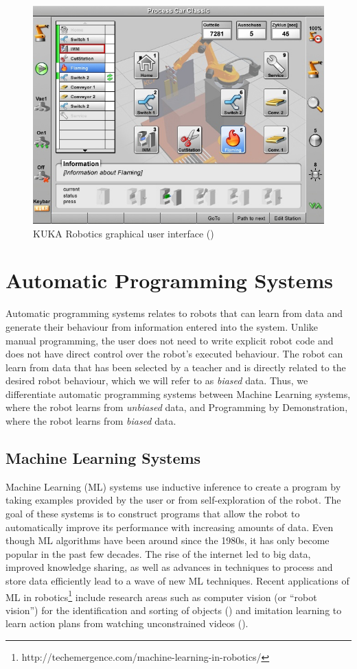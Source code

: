 \begin{figure}[h]
	\centering
	\includegraphics[width=0.8\linewidth]{figures/kuka.jpg}
	\caption{KUKA Robotics graphical user interface (\cite{kuka2006})}
	\label{fig:Kuka}
\end{figure} 

\section{Automatic Programming Systems}\label{subsec:Automatic Programming Systems}
Automatic programming systems relates to robots that can learn from data and generate their behaviour from information entered into the system.
Unlike manual programming, the user does not need to write explicit robot code and does not have direct control over the robot's executed behaviour.
The robot can learn from data that has been selected by a teacher and is directly related to the desired robot behaviour, which we will refer to as \textit{biased} data.
Thus, we differentiate automatic programming systems between Machine Learning systems, where the robot learns from \textit{unbiased} data, and Programming by Demonstration, where the robot learns from \textit{biased} data.

\subsection{Machine Learning Systems}\label{sssec:Learning Systems}
Machine Learning (ML) systems use inductive inference to create a program by taking examples provided by the user or from self-exploration of the robot. 
The goal of these systems is to construct programs that allow the robot to automatically improve its performance with increasing amounts of data. 
Even though ML algorithms have been around since the 1980s, it has only become popular in the past few decades. 
The rise of the internet led to big data, improved knowledge sharing, as well as advances in techniques to process and store data efficiently lead to a wave of new ML techniques.
Recent applications of ML in robotics\footnote{http://techemergence.com/machine-learning-in-robotics/} include research areas such as computer vision (or ``robot vision'') for the identification and sorting of objects (\cite{stager2013computer}) and imitation learning to learn action plans from watching unconstrained videos (\cite{Yang2015}).

